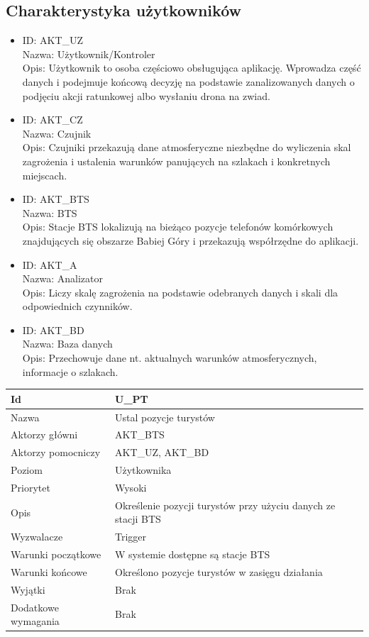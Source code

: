 \documentclass[a4paper,12pt]{article}
\begin{document}
\subsection{Charakterystyka użytkowników}
\begin{itemize}
\item ID: AKT\_UZ\\
Nazwa: Użytkownik/Kontroler\\
Opis: Użytkownik to osoba częściowo obsługująca aplikację. Wprowadza
część danych i podejmuje końcową decyzję na podstawie zanalizowanych
danych o podjęciu akcji ratunkowej albo wysłaniu drona na zwiad.
\item ID: AKT\_CZ\\
Nazwa: Czujnik\\
Opis: Czujniki przekazują dane atmosferyczne niezbędne do wyliczenia skal
zagrożenia i ustalenia warunków panujących na szlakach i konkretnych
miejscach.
\item ID: AKT\_BTS\\
Nazwa: BTS\\
Opis: Stacje BTS lokalizują na bieżąco pozycje telefonów komórkowych
znajdujących się obszarze Babiej Góry i przekazują współrzędne do aplikacji.
\item ID: AKT\_A\\
Nazwa: Analizator\\
Opis: Liczy skalę zagrożenia na podstawie odebranych danych i skali dla
odpowiednich czynników.
\item ID: AKT\_BD\\
Nazwa: Baza danych\\
Opis: Przechowuje dane nt. aktualnych warunków atmosferycznych,
informacje o szlakach.
\end{itemize}
\newpage
\begin{longtable}{| p{5cm} | p{10cm} |}
\hline
Id & U\_PT \\\hline
Nazwa & Ustal pozycje turystów \\\hline
Aktorzy główni & AKT\_BTS \\\hline
Aktorzy pomocniczy & AKT\_UZ, AKT\_BD \\\hline
Poziom & Użytkownika \\\hline
Priorytet & Wysoki \\\hline
Opis & Określenie pozycji turystów przy użyciu danych ze stacji BTS \\\hline
Wyzwalacze & Trigger \\\hline
Warunki początkowe & W systemie dostępne są stacje BTS \\\hline
Warunki końcowe & Określono pozycje turystów w zasięgu działania \\\hline
Wyjątki & Brak \\\hline
Dodatkowe wymagania & Brak \\\hline
\end{longtable}
\end{document}
